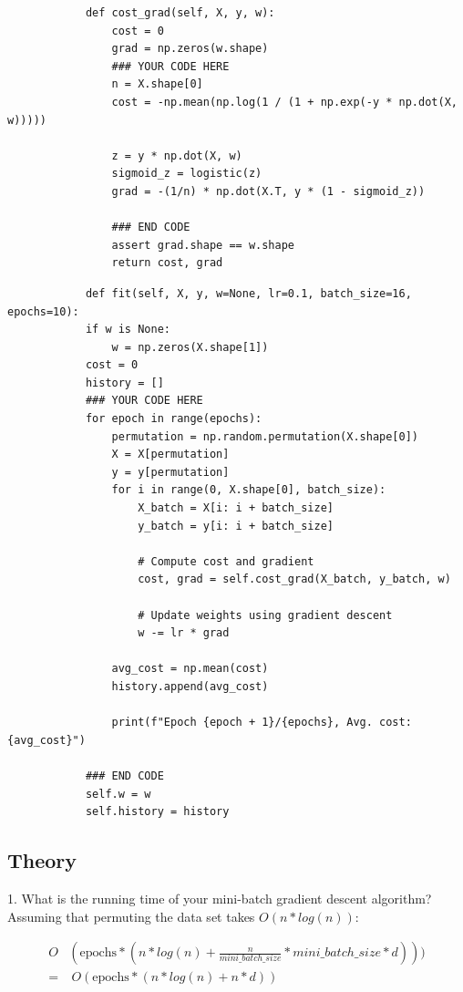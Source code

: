 \documentclass[english,11pt,a4paper,titlepage]{report}
\begin{document}
		\begin{verbatim}
			def cost_grad(self, X, y, w):
				cost = 0
				grad = np.zeros(w.shape)
				### YOUR CODE HERE
				n = X.shape[0]
				cost = -np.mean(np.log(1 / (1 + np.exp(-y * np.dot(X, w)))))
				
				z = y * np.dot(X, w)
				sigmoid_z = logistic(z)
				grad = -(1/n) * np.dot(X.T, y * (1 - sigmoid_z))
				
				### END CODE
				assert grad.shape == w.shape
				return cost, grad
		\end{verbatim}
		
		\begin{verbatim}
			def fit(self, X, y, w=None, lr=0.1, batch_size=16, epochs=10):
			if w is None:
				w = np.zeros(X.shape[1])
			cost = 0
			history = []
			### YOUR CODE HERE
			for epoch in range(epochs):
			    permutation = np.random.permutation(X.shape[0])
			    X = X[permutation]
			    y = y[permutation]
			    for i in range(0, X.shape[0], batch_size):
			        X_batch = X[i: i + batch_size]
			        y_batch = y[i: i + batch_size]
			
			        # Compute cost and gradient
			        cost, grad = self.cost_grad(X_batch, y_batch, w)
			
			        # Update weights using gradient descent
			        w -= lr * grad
			
			    avg_cost = np.mean(cost)
			    history.append(avg_cost)
			
			    print(f"Epoch {epoch + 1}/{epochs}, Avg. cost: {avg_cost}")
			
			### END CODE
			self.w = w
			self.history = history
		\end{verbatim}
		
	\subsection*{Theory}
	
	1. What is the running time of your mini-batch gradient descent algorithm?\\
	
	Assuming that permuting the data set takes $O(n * log(n))$:
		
	\begin{align*}
		O&(\textrm{epochs} * (n * log(n) + \frac{n}{mini\_batch\_size} * mini\_batch\_size * d))) \\
		= & \ O(\textrm{epochs} * (n * log(n) + n * d))
	\end{align*}
	
\end{document}
